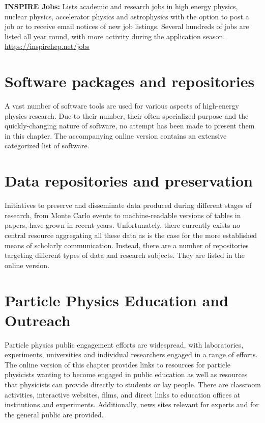   \textbf{INSPIRE Jobs:} Lists academic and research jobs in high
  energy physics, nuclear physics, accelerator physics and astrophysics
  with the option to post a job or to receive email notices of new job
  listings. Several hundreds of jobs are listed all year round, with more activity during the application season.
  \url{https://inspirehep.net/jobs}

\section{Software packages and
repositories}\label{databases:sec:repositories}

A vast number of software tools are used for various aspects of high-energy
physics research. Due to their number, their often specialized purpose and the
quickly-changing nature of software, no attempt has been made to present them in this chapter.
The accompanying online version contains an extensive categorized list of software.

\section{Data repositories and preservation}\label{databases:sec:datarepositories}


Initiatives to preserve and disseminate data produced during different stages
of research, from Monte Carlo events to machine-readable versions of tables in
papers, have grown in recent years.  Unfortunately, there currently exists no
central resource aggregating all these data as is the case for the more
established means of scholarly communication. Instead, there are a number of
repositories targeting different types of data and research subjects. They are
listed in the online version.

\section{Particle Physics Education and Outreach
}\label{databases:sec:edusites}

Particle physics public engagement efforts are widespread, with laboratories, 
experiments, universities and individual researchers engaged in a range
of efforts. The online version of this chapter provides links to resources
for particle physicists wanting to become engaged in public education as 
well as resources that physicists can provide directly to students or lay
people. There are classroom activities, interactive websites, films, and
direct links to education offices at institutions and experiments. Additionally, 
news sites relevant for experts and for the general public are provided. 
